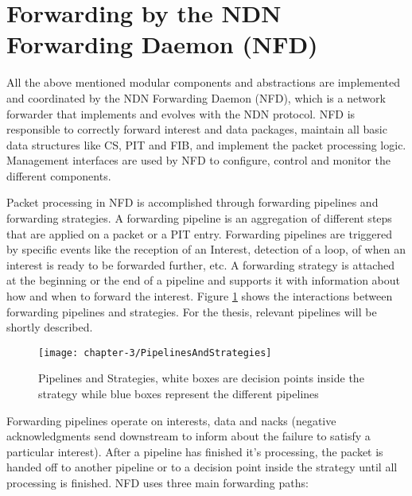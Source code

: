 \section{Forwarding by the NDN Forwarding Daemon (NFD)}

\vspace{5mm} %

All the above mentioned modular components and abstractions are implemented and coordinated by the NDN Forwarding Daemon (NFD), which is a network forwarder that implements and evolves with the NDN protocol. NFD is responsible to correctly forward interest and data packages, maintain all basic data structures like CS, PIT and FIB, and implement the packet processing logic. Management interfaces are used by NFD to configure, control and monitor the different components.

\vspace{5mm} %

Packet processing in NFD is accomplished through forwarding pipelines and forwarding strategies. A forwarding pipeline is an aggregation of different steps that are applied on a packet or a PIT entry. Forwarding pipelines are triggered by specific events like the reception of an Interest, detection of a loop, of when an interest is ready to be forwarded further, etc. A forwarding strategy is attached at the beginning or the end of a pipeline and supports it with information about how and when to forward the interest. Figure \ref{fig:PipelinesAndStrategies} shows the interactions between forwarding pipelines and strategies. For the thesis, relevant pipelines will be shortly described.

\vspace{5mm} %

\begin{figure}[H]
  \centering
  \texttt{[image: chapter-3/PipelinesAndStrategies]}
  \caption{Pipelines and Strategies, white boxes are decision points inside the strategy while blue boxes represent the different pipelines \cite{Afanasyev16}}
  \label{fig:PipelinesAndStrategies}
\end{figure}

\vspace{5mm} %

Forwarding pipelines operate on interests, data and nacks (negative acknowledgments send downstream to inform about the failure to satisfy a particular interest). After a pipeline has finished it's processing, the packet is handed off to another pipeline or to a decision point inside the strategy until all processing is finished. NFD uses three main forwarding paths:

